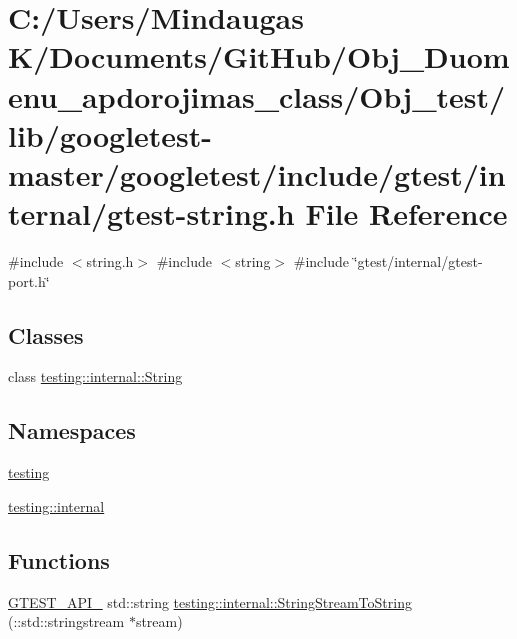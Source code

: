 \hypertarget{_obj__test_2lib_2googletest-master_2googletest_2include_2gtest_2internal_2gtest-string_8h}{}\section{C\+:/\+Users/\+Mindaugas K/\+Documents/\+Git\+Hub/\+Obj\+\_\+\+Duomenu\+\_\+apdorojimas\+\_\+class/\+Obj\+\_\+test/lib/googletest-\/master/googletest/include/gtest/internal/gtest-\/string.h File Reference}
\label{_obj__test_2lib_2googletest-master_2googletest_2include_2gtest_2internal_2gtest-string_8h}
{\ttfamily \#include $<$string.\+h$>$}\newline
{\ttfamily \#include $<$string$>$}\newline
{\ttfamily \#include \char`\"{}gtest/internal/gtest-\/port.\+h\char`\"{}}\newline
\subsection*{Classes}
\begin{DoxyCompactItemize}
\item 
class \mbox{\hyperlink{classtesting_1_1internal_1_1_string}{testing\+::internal\+::\+String}}
\end{DoxyCompactItemize}
\subsection*{Namespaces}
\begin{DoxyCompactItemize}
\item 
 \mbox{\hyperlink{namespacetesting}{testing}}
\item 
 \mbox{\hyperlink{namespacetesting_1_1internal}{testing\+::internal}}
\end{DoxyCompactItemize}
\subsection*{Functions}
\begin{DoxyCompactItemize}
\item 
\mbox{\hyperlink{_obj__test_2lib_2googletest-release-1_88_81_2googletest_2include_2gtest_2internal_2gtest-port_8h_aa73be6f0ba4a7456180a94904ce17790}{G\+T\+E\+S\+T\+\_\+\+A\+P\+I\+\_\+}} std\+::string \mbox{\hyperlink{namespacetesting_1_1internal_ac0a2b7f69fc829d80a39e925b6417e39}{testing\+::internal\+::\+String\+Stream\+To\+String}} (\+::std\+::stringstream $\ast$stream)
\end{DoxyCompactItemize}
